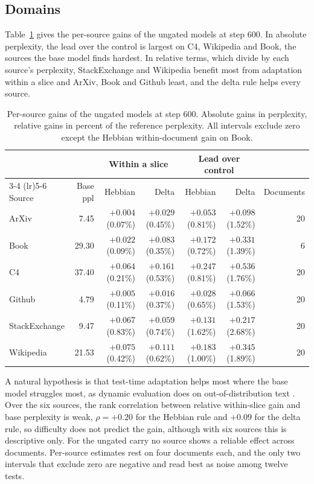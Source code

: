 \documentclass[12pt,a4paper]{report}
\begin{document}
\subsection{Domains}
\label{ch-q2}

Table~\ref{tab-sources} gives the per-source gains of the ungated models at step 600. In absolute perplexity, the lead over the control is largest on C4, Wikipedia and Book, the sources the base model finds hardest. In relative terms, which divide by each source's perplexity, StackExchange and Wikipedia benefit most from adaptation within a slice and ArXiv, Book and Github least, and the delta rule helps every source.

\begin{table}[H]
  \centering
  \caption{Per-source gains of the ungated models at step 600. Absolute gains in perplexity, relative gains in percent of the reference perplexity. All intervals exclude zero except the Hebbian within-document gain on Book.}
  \label{tab-sources}
  \small
  \begin{tabular}{lrrrrrr}
    \toprule
    & & \multicolumn{2}{c}{Within a slice} & \multicolumn{2}{c}{Lead over control} & \\
    \cmidrule(lr){3-4} \cmidrule(lr){5-6}
    Source & Base ppl & Hebbian & Delta & Hebbian & Delta & Documents \\
    \midrule
    ArXiv & 7.45 & $+0.004$ (0.07\%) & $+0.029$ (0.45\%) & $+0.053$ (0.81\%) & $+0.098$ (1.52\%) & 20 \\
    Book & 29.30 & $+0.022$ (0.09\%) & $+0.083$ (0.35\%) & $+0.172$ (0.72\%) & $+0.331$ (1.39\%) & 6 \\
    C4 & 37.40 & $+0.064$ (0.21\%) & $+0.161$ (0.53\%) & $+0.247$ (0.81\%) & $+0.536$ (1.76\%) & 20 \\
    Github & 4.79 & $+0.005$ (0.11\%) & $+0.016$ (0.37\%) & $+0.028$ (0.65\%) & $+0.066$ (1.53\%) & 20 \\
    StackExchange & 9.47 & $+0.067$ (0.83\%) & $+0.059$ (0.74\%) & $+0.131$ (1.62\%) & $+0.217$ (2.68\%) & 20 \\
    Wikipedia & 21.53 & $+0.075$ (0.42\%) & $+0.111$ (0.62\%) & $+0.183$ (1.00\%) & $+0.345$ (1.89\%) & 20 \\
    \bottomrule
  \end{tabular}
\end{table}

A natural hypothesis is that test-time adaptation helps most where the base model struggles most, as dynamic evaluation does on out-of-distribution text \citep{krause2018dynamic}. Over the six sources, the rank correlation between relative within-slice gain and base perplexity is weak, $\rho = +0.20$ for the Hebbian rule and $+0.09$ for the delta rule, so difficulty does not predict the gain, although with six sources this is descriptive only. For the ungated carry no source shows a reliable effect across documents. Per-source estimates rest on four documents each, and the only two intervals that exclude zero are negative and read best as noise among twelve tests.
\end{document}
